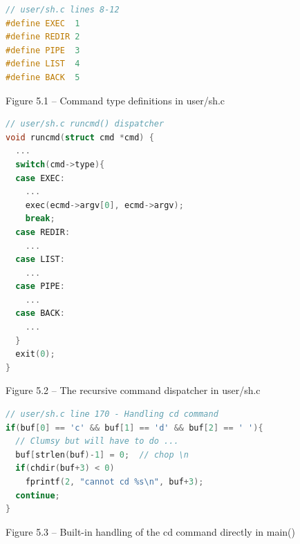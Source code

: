 \documentclass[12pt,a4paper]{report}
\numberwithin{equation}{chapter}
\numberwithin{figure}{chapter}
\numberwithin{table}{chapter}
\begin{document}
\begin{figure}[H]
\centering
\begin{lstlisting}[language=c]
// user/sh.c lines 8-12
#define EXEC  1
#define REDIR 2
#define PIPE  3
#define LIST  4
#define BACK  5
\end{lstlisting}
\caption{Figure 5.1 -- Command type definitions in user/sh.c}
\end{figure}

\begin{figure}[H]
\centering
\begin{lstlisting}[language=c]
// user/sh.c runcmd() dispatcher
void runcmd(struct cmd *cmd) {
  ...
  switch(cmd->type){
  case EXEC:
    ...
    exec(ecmd->argv[0], ecmd->argv);
    break;
  case REDIR:
    ...
  case LIST:
    ...
  case PIPE:
    ...
  case BACK:
    ...
  }
  exit(0);
}
\end{lstlisting}
\caption{Figure 5.2 -- The recursive command dispatcher in user/sh.c}
\end{figure}

\begin{figure}[H]
\centering
\begin{lstlisting}[language=c]
// user/sh.c line 170 - Handling cd command
if(buf[0] == 'c' && buf[1] == 'd' && buf[2] == ' '){
  // Clumsy but will have to do ...
  buf[strlen(buf)-1] = 0;  // chop \n
  if(chdir(buf+3) < 0)
    fprintf(2, "cannot cd %s\n", buf+3);
  continue;
}
\end{lstlisting}
\caption{Figure 5.3 -- Built-in handling of the cd command directly in main()}
\end{figure}
\end{document}
